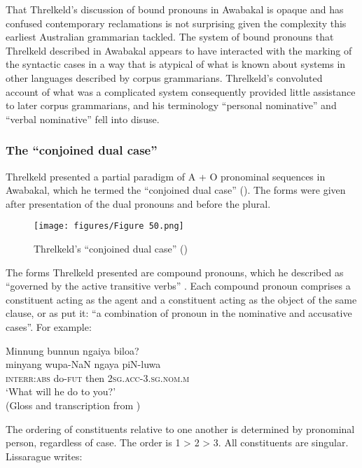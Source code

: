That Threlkeld’s discussion of bound pronouns in Awabakal is opaque and has confused contemporary reclamations is not surprising given the complexity this earliest Australian grammarian tackled. The system of bound pronouns that Threlkeld described in Awabakal appears to have interacted with the marking of the syntactic cases in a way that is atypical of what is known about systems in other languages described by corpus grammarians. Threlkeld’s convoluted account of what was a complicated system consequently provided little assistance to later corpus grammarians, and his terminology “personal nominative” and “verbal nominative” fell into disuse. 

\subsubsection{The ``conjoined dual case''}
\label{sec:key:3.3.6.2}

Threlkeld presented a partial paradigm of A + O pronominal sequences in Awabakal, which he termed the “conjoined dual case” (). The forms were given after presentation of the dual pronouns and before the plural.
\begin{figure}
\texttt{[image: figures/Figure 50.png]}
\caption{\label{fig:3:50} Threlkeld’s “conjoined dual case” (\citeyear[24]{threlkeld_australian_1834})}
\end{figure}


The forms Threlkeld presented are compound pronouns, which he described as “governed by the active transitive verbs” \citep[24]{threlkeld_australian_1834}. Each compound pronoun comprises a constituent acting as the agent and a constituent acting as the object of the same clause, or as \citet[152]{elkin_nature_1937} put it: “a combination of pronoun in the nominative and accusative cases”. For example: 

\ea\label{ex:3:25}
\glll Minnung 	bunnun 	        ngaiya 	biloa?  \\
minyang 	wupa-NaN    ngaya 	piN-luwa \\
\textsc{interr:abs}	do-\textsc{fut} 	      then 	2\textsc{sg}.\textsc{acc}-3.\textsc{sg}.\textsc{nom}.\textsc{m} \\
\glt `What will he do to you?' \\
(Gloss and transcription from \citealt[42]{lissarrague_salvage_2006})
\z

The ordering of constituents relative to one another is determined by pronominal person, regardless of case. The order is 1 > 2 > 3. All constituents are singular. Lissarague writes:

